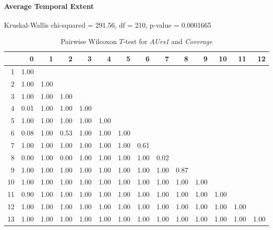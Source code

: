 \paragraph{Average Temporal Extent}
Kruskal-Wallis chi-squared = 291.56, df = 210, p-value = 0.0001665

\begin{table}[ht]
	\small
	\centering
	\begin{tabular}{rrrrrrrrrrrrrr}
		\hline
	   & 0 & 1 & 2 & 3 & 4 & 5 & 6 & 7 & 8 & 9 & 10 & 11 & 12 \\ 
		\hline
	  1 & 1.00 &  &  &  &  &  &  &  &  &  &  &  &  \\ 
		2 & 1.00 & 1.00 &  &  &  &  &  &  &  &  &  &  &  \\ 
		3 & 1.00 & 1.00 & 1.00 &  &  &  &  &  &  &  &  &  &  \\ 
		4 & 0.01 & 1.00 & 1.00 & 1.00 &  &  &  &  &  &  &  &  &  \\ 
		5 & 1.00 & 1.00 & 1.00 & 1.00 & 1.00 &  &  &  &  &  &  &  &  \\ 
		6 & 0.08 & 1.00 & 0.53 & 1.00 & 1.00 & 1.00 &  &  &  &  &  &  &  \\ 
		7 & 1.00 & 1.00 & 1.00 & 1.00 & 1.00 & 1.00 & 0.61 &  &  &  &  &  &  \\ 
		8 & 0.00 & 1.00 & 0.00 & 1.00 & 1.00 & 1.00 & 1.00 & 0.02 &  &  &  &  &  \\ 
		9 & 1.00 & 1.00 & 1.00 & 1.00 & 1.00 & 1.00 & 1.00 & 1.00 & 0.87 &  &  &  &  \\ 
		10 & 1.00 & 1.00 & 1.00 & 1.00 & 1.00 & 1.00 & 1.00 & 1.00 & 1.00 & 1.00 &  &  &  \\ 
		11 & 0.90 & 1.00 & 1.00 & 1.00 & 1.00 & 1.00 & 1.00 & 1.00 & 1.00 & 1.00 & 1.00 &  &  \\ 
		12 & 1.00 & 1.00 & 1.00 & 1.00 & 1.00 & 1.00 & 1.00 & 1.00 & 1.00 & 1.00 & 1.00 & 1.00 &  \\ 
		13 & 1.00 & 1.00 & 1.00 & 1.00 & 1.00 & 1.00 & 1.00 & 1.00 & 1.00 & 1.00 & 1.00 & 1.00 & 1.00 \\ 
		 \hline
	  \end{tabular}
    \caption{Pairwise Wilcoxon $T$-test for \textit{AUrs1} and \textit{Coverage}}
    \label{tbl:wilcoxon_baysis_initiator_AUrs1_Cov}
\end{table}
